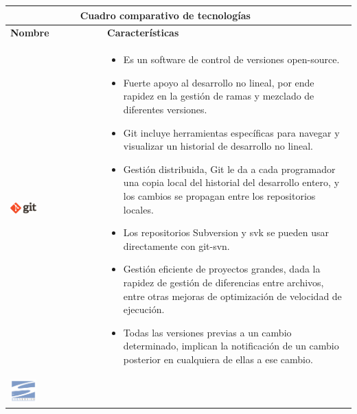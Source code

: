\newpage
\begin{table}[b!]
	\centering
	\vspace{-30mm}
	\begin{tabular}{|p{2cm}|ll}
		\hline
		\multicolumn{2}{|c|}{{\bf Cuadro comparativo de tecnologías}} \\ 
		\hline
		\multicolumn{1}{|p{4cm}|}{{\bf Nombre}}                                             &   
		\multicolumn{1}{p{10cm}|}{{\bf Características}}\\
		\hline
		\multicolumn{1}{|p{5cm}|}{\includegraphics[width=0.3\textwidth]{images/git}}        &   
		\multicolumn{2}{p{10cm}|}{\begin{itemize}
		\vspace{-17mm}
		\item Es un software de control de versiones open-source.
		\item Fuerte apoyo al desarrollo no lineal, por ende rapidez en la gestión de ramas y mezclado de diferentes versiones. 
		\item Git incluye herramientas específicas para navegar y visualizar un historial de desarrollo no lineal.
		\item Gestión distribuida, Git le da a cada programador una copia local del historial del desarrollo entero, y los cambios se propagan entre los repositorios locales.
		\item Los repositorios Subversion y svk se pueden usar directamente con git-svn.
		\item Gestión eficiente de proyectos grandes, dada la rapidez de gestión de diferencias entre archivos, entre otras mejoras de optimización de velocidad de ejecución.
		\item Todas las versiones previas a un cambio determinado, implican la notificación de un cambio posterior en cualquiera de ellas a ese cambio.\cite{38}
		\end{itemize}} \\
		\hline
		\multicolumn{1}{|p{5cm}|}{\includegraphics[width=0.3\textwidth]{images/subversion}} &   

\end{tabular}
\end{table}
